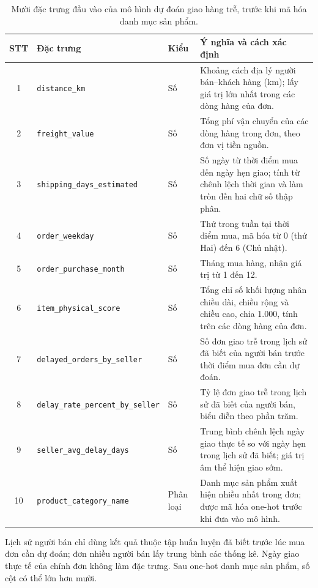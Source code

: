 \documentclass[a4paper]{article}
\begin{document}
\begin{table}[htbp]
\centering
\small
\begin{tabularx}{\textwidth}{|c|p{5.4cm}|p{1.4cm}|X|}
\hline
\textbf{STT} & \textbf{Đặc trưng} & \textbf{Kiểu} & \textbf{Ý nghĩa và cách xác định} \\ \hline
1 & \texttt{distance\_km} & Số & Khoảng cách địa lý người bán--khách hàng (km); lấy giá trị lớn nhất trong các dòng hàng của đơn. \\ \hline
2 & \texttt{freight\_value} & Số & Tổng phí vận chuyển của các dòng hàng trong đơn, theo đơn vị tiền nguồn. \\ \hline
3 & \texttt{shipping\_days\_estimated} & Số & Số ngày từ thời điểm mua đến ngày hẹn giao; tính từ chênh lệch thời gian và làm tròn đến hai chữ số thập phân. \\ \hline
4 & \texttt{order\_weekday} & Số & Thứ trong tuần tại thời điểm mua, mã hóa từ 0 (thứ Hai) đến 6 (Chủ nhật). \\ \hline
5 & \texttt{order\_purchase\_month} & Số & Tháng mua hàng, nhận giá trị từ 1 đến 12. \\ \hline
6 & \texttt{item\_physical\_score} & Số & Tổng chỉ số khối lượng nhân chiều dài, chiều rộng và chiều cao, chia 1.000, tính trên các dòng hàng của đơn. \\ \hline
7 & \texttt{delayed\_orders\_by\_seller} & Số & Số đơn giao trễ trong lịch sử đã biết của người bán trước thời điểm mua đơn cần dự đoán. \\ \hline
8 & \texttt{delay\_rate\_percent\_by\_seller} & Số & Tỷ lệ đơn giao trễ trong lịch sử đã biết của người bán, biểu diễn theo phần trăm. \\ \hline
9 & \texttt{seller\_avg\_delay\_days} & Số & Trung bình chênh lệch ngày giao thực tế so với ngày hẹn trong lịch sử đã biết; giá trị âm thể hiện giao sớm. \\ \hline
10 & \texttt{product\_category\_name} & Phân loại & Danh mục sản phẩm xuất hiện nhiều nhất trong đơn; được mã hóa one-hot trước khi đưa vào mô hình. \\ \hline
\end{tabularx}
\caption{Mười đặc trưng đầu vào của mô hình dự đoán giao hàng trễ, trước khi mã hóa danh mục sản phẩm.}
\label{tab:late-features}
\end{table}

Lịch sử người bán chỉ dùng kết quả thuộc tập huấn luyện đã biết trước lúc mua đơn cần dự đoán; đơn nhiều người bán lấy trung bình các thống kê. Ngày giao thực tế của chính đơn không làm đặc trưng. Sau one-hot danh mục sản phẩm, số cột có thể lớn hơn mười.
\end{document}
